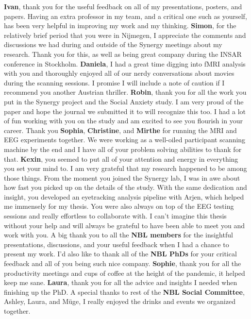 \textbf{Ivan}, thank you for the useful feedback on all of my presentations, posters, and papers. Having an extra professor in my team, and a critical one such as yourself, has been very helpful in improving my work and my thinking. \newline
\textbf{Simon}, for the relatively brief period that you were in Nijmegen, I appreciate the comments and discussions we had during and outside of the Synergy meetings about my research. Thank you for this, as well as being great company during the INSAR conference in Stockholm. \newline
\textbf{Daniela}, I had a great time digging into fMRI analysis with you and thoroughly enjoyed all of our nerdy conversations about movies during the scanning sessions. I promise I will include a note of caution if I recommend you another Austrian thriller. \newline
\textbf{Robin}, thank you for all the work you put in the Synergy project and the Social Anxiety study. I am very proud of the paper and hope the journal we submitted it to will recognize this too. I had a lot of fun working with you on the study and am excited to see you flourish in your career. \newline
Thank you \textbf{Sophia}, \textbf{Christine}, and \textbf{Mirthe} for running the MRI and EEG experiments together. We were working as a well-oiled participant scanning machine by the end and I have all of your problem solving abilities to thank for that. \newline
\textbf{Kexin}, you seemed to put all of your attention and energy in everything you set your mind to. I am very grateful that my research happened to be among those things. From the moment you joined the Synergy lab, I was in awe about how fast you picked up on the details of the study. With the same dedication and insight, you developed an eyetracking analysis pipeline with Arjen, which helped me immensely for my thesis. You were also always on top of the EEG testing sessions and really effortless to collaborate with. I can't imagine this thesis without your help and will always be grateful to have been able to meet you and work with you. \newline
A big thank you to all the \textbf{NBL members} for the insightful presentations, discussions, and your useful feedback when I had a chance to present my work. I'd also like to thank all of the \textbf{NBL PhDs} for your critical feedback and all of you being such nice company. \textbf{Sophie}, thank you for all the productivity meetings and cups of coffee at the height of the pandemic, it helped keep me sane. \textbf{Laura}, thank you for all the advice and insights I needed when finishing up the PhD. A special thanks to rest of the \textbf{NBL Social Committee}, Ashley, Laura, and M\"{u}ge, I really enjoyed the drinks and events we organized together. \newline
